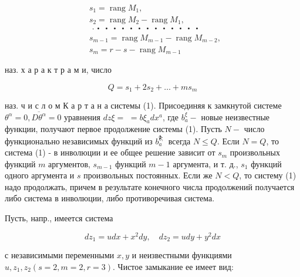\documentclass[10pt]{article}
\begin{document}
\[

\begin{aligned}

& s_{1}=\operatorname{rang} M_{1} \text {, } \\

& s_{2}=\operatorname{rang} M_{2}-\operatorname{rang} M_{1} \text {, } \\

& \text { ·・・・・・・・・・・・・・ } \\

& s_{m-1}=\operatorname{rang} M_{m-1}-\operatorname{rang} M_{m-2} \text {, } \\

& s_{m}=r-s-\operatorname{rang} M_{m-1}

\end{aligned}

\]



наз. х а р а к т р а м и, число



\[

Q=s_{1}+2 s_{2}+\ldots+m s_{m}

\]



наз. ч и с л о м К а р т а н а системы (1). Присоединяя к замкнутой системе $\theta^{\alpha}=0, \overline{D \theta^{\alpha}}=0$ уравнения $d z \xi=$ $=b \xi_{a} d x^{a}$, где $b_{a}^{\xi}-$ новые неизвестные функции, получают первое продолжение системы (1). Пусть $N-$ число функционально независимых функций из $b_{a}^{\text {है; }}$ всегда $N \leqslant Q$. Если $N=Q$, то система (1) - в инволюции и ее общее решение зависит от $s_{m}$ произвольных функций $m$ аргументов, $s_{m-1}$ функций $m-1$ аргумента, и т. д., $s_{1}$ функций одного аргумента и $s$ произвольных постоянных. Если же $N<Q$, то систему (1) надо продолжать, причем в результате конечного числа продолжений получается либо система в инволюции, либо противоречивая система.



Пусть, напр., имеется система



\[

d z_{1}=u d x+x^{2} d y, \quad d z_{2}=u d y+y^{2} d x

\]



с независимыми переменными $x, y$ и неизвестными функциями $u, z_{1}, z_{2}(s=2, m=2, r=3)$. Чистое замыкание ее имеет вид:
\end{document}
